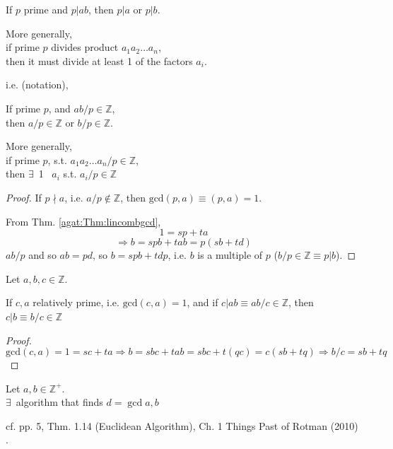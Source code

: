 \begin{theorem}
If $p$ prime and $p|ab$, then $p|a$ or $p|b$.  

More generally,  \\
if prime $p$ divides product $a_1a_2\dots a_n$, \\
then it must divide at least 1 of the factors $a_i$.  

i.e. (notation),  

If prime $p$, and $ab/p \in \mathbb{Z}$, \\
then $a/p\in \mathbb{Z}$ or $b/p \in \mathbb{Z}$.  

More generally, \\
if prime $p$, s.t. $a_1a_2 \dots a_n/p \in \mathbb{Z}$, \\
then $\exists \, $ 1 \, $a_i$ s.t. $a_i/p \in \mathbb{Z}$
\end{theorem}
\begin{proof}
If $p\nmid a$, i.e. $a/p \notin \mathbb{Z}$, then $\text{gcd}(p,a)  \equiv (p,a) =1$.  

From Thm. \ref{agat:Thm:lincombgcd}, 
\[
1 = sp+ta
\]
\[
\Longrightarrow b = spb + tab = p(sb+td)
\]
$ab/p$ and so $ab=pd$, so $b=spb+tdp$, i.e. $b$ is a multiple of $p$ ($b/p \in \mathbb{Z} \equiv p | b$).  




\end{proof}

\begin{corollary}\label{agat:Cor:relprimefactors}
Let $a,b,c \in \mathbb{Z}$.  

If $c,a$ relatively prime, i.e. $\text{gcd}(c,a)=1$, and if $c|ab \equiv ab/c\in \mathbb{Z}$,
then $c|b \equiv b/c \in \mathbb{Z}$
\end{corollary}
\begin{proof}
\[
\text{gcd}(c,a)=1 = sc+ta \Longrightarrow b=sbc + tab = sbc + t(qc) = c(sb+tq) \Longrightarrow b/c = sb+tq 
\]
\end{proof}

\begin{theorem}
	Let $a,b \in \mathbb{Z}^+$.  \\
	$\exists \, $ algorithm that finds $d= \gcd{a,b}$
\end{theorem}

cf. pp. 5, Thm. 1.14 (Euclidean Algorithm), Ch. 1 Things Past of Rotman (2010) \cite{agat:JRotman2010}.  

